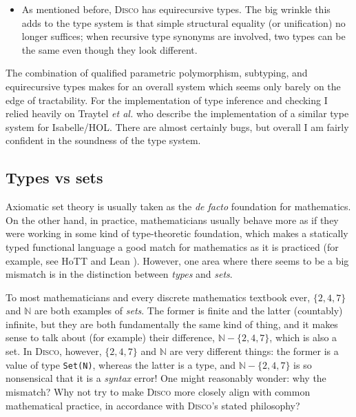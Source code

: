 \documentclass[copyright,creativecommons,11pt]{eptcs}
\newcommand{\disco}{\textsc{Disco}\xspace}
\newcommand{\etal}{\emph{et al.}\xspace}
\newcommand{\N}{\mathbb{N}}
\begin{document}
\begin{itemize}
  One interesting idea to improve the situation would be to show the
  user \emph{multiple} potential monomorphic instantiations of a
  general type scheme, something like this, perhaps:

{\small \begin{verbatim}
Disco> :type \x. x - 2
λx. x - 2
  : ℤ → ℤ
  : ℚ → ℚ
\end{verbatim}}

\item As mentioned before, \disco has equirecursive types.  The big
  wrinkle this adds to the type system is that simple structural
  equality (or unification) no longer suffices; when recursive type
  synonyms are involved, two types can be the same even though they
  look different.
\end{itemize}

The combination of qualified parametric polymorphism, subtyping, and
equirecursive types makes for an overall system which seems only
barely on the edge of tractability.  For the implementation of type
inference and checking I relied heavily on Traytel \etal
\cite{traytel2011extending} who describe the implementation of a
similar type system for Isabelle/HOL.  There are almost certainly
bugs, but overall I am fairly confident in the soundness of the type
system.

\subsection{Types vs sets}
\label{sec:typesvsets}

Axiomatic set theory is usually taken as the \emph{de facto}
foundation for mathematics.  On the other hand, in practice,
mathematicians usually behave more as if they were working in some
kind of type-theoretic foundation, which makes a statically typed
functional language a good match for mathematics as it is practiced
(for example, see HoTT \cite{hottbook} and Lean \cite{moura2021lean}).
However, one area where there seems to be a big mismatch is in the
distinction between \emph{types} and \emph{sets}.

To most mathematicians and every discrete mathematics textbook ever,
$\{2,4,7\}$ and $\N$ are both examples of \emph{sets}.  The former is
finite and the latter (countably) infinite, but they are both
fundamentally the same kind of thing, and it makes sense to talk about
(for example) their difference, $\N - \{2,4,7\}$, which is also a set.
In \disco, however, $\{2,4,7\}$ and $\N$ are very different things:
the former is a value of type \texttt{Set(N)}, whereas the
latter is a type, and $\N - \{2,4,7\}$ is so nonsensical that it is a
\emph{syntax} error!  One might reasonably wonder: why the mismatch?
Why not try to make \disco more closely align with common mathematical
practice, in accordance with \disco's stated philosophy?
\end{document}
